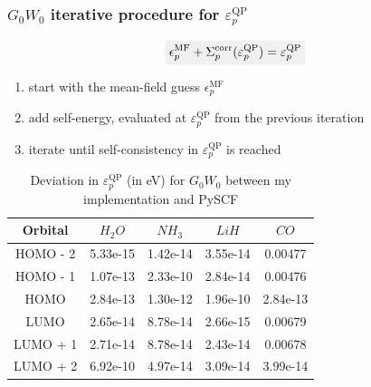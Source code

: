 \documentclass{beamer}
\newcommand{\highlight}[1]{\colorbox{caltechgray!10}{$\displaystyle#1$}}
\begin{document}
\begin{frame}
    \frametitle{\textcolor{caltechorange}{$G_0W_0$ iterative procedure \autocite{bruneval_assessment_2019} for $\varepsilon_{p}^{\mathrm{QP}}$}}
    \begin{equation}
\highlight{\epsilon_p^{\mathrm{MF}} + \Sigma_p^{\mathrm{corr}}(\varepsilon_p^{\mathrm{QP}}) = \varepsilon_p^{\mathrm{QP}}}
    \end{equation}
    \begin{enumerate}
        \item start with the mean-field guess $\epsilon_p^{\mathrm{MF}}$
        \item add self-energy, evaluated at $\varepsilon_p^{\mathrm{QP}}$ from the previous iteration
        \item iterate until self-consistency in $\varepsilon_p^{\mathrm{QP}}$ is reached
    \end{enumerate}
\pause
    \begin{table}[h]
    \centering
    \caption{Deviation in $\varepsilon_p^{\mathrm{QP}}$ (in eV) for $G_0W_0$ between my implementation and PySCF\autocite{sun_recent_2020}}
    \begin{tabular}{|c|c|c|c|c|}
    \hline
    \multirow{1}{*}{Orbital} & \multicolumn{1}{c|}{$H_2O$} & \multicolumn{1}{c|}{$NH_3$} & \multicolumn{1}{c|}{$LiH$} & \multicolumn{1}{c|}{$CO$} \\
    \hline
    HOMO - 2 & 5.33e-15 & 1.42e-14 & 3.55e-14 & 0.00477 \\
    \hline
    HOMO - 1 & 1.07e-13 & 2.33e-10 & 2.84e-14 & 0.00476 \\
    \hline
    HOMO     & 2.84e-13 & 1.30e-12 & 1.96e-10 & 2.84e-13 \\
    \hline
    LUMO     & 2.65e-14 & 8.78e-14 & 2.66e-15 & 0.00679 \\
    \hline
    LUMO + 1 & 2.71e-14 & 8.78e-14 & 2.43e-14 & 0.00678 \\
    \hline
    LUMO + 2 & 6.92e-10 & 4.97e-14 & 3.09e-14 & 3.99e-14 \\
    \hline
    \end{tabular}
    \end{table}
\end{frame}
\end{document}
